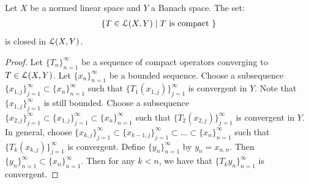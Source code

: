 \begin{theorem}
    Let $X$ be a normed linear space and $Y$ a Banach space. The set:
        \begin{equation*}
        \begin{split}
            \{T \in \mathcal{L}(X,Y) \mid T \text{ is compact }\}
        \end{split}
        \end{equation*}
    is closed in $\mathcal{L}(X,Y)$.
\end{theorem}
    \begin{proof}
        Let $\{T_n\}_{n = 1}^\infty$ be a sequence of compact operators converging to $T \in \mathcal{L}(X,Y)$. Let $\{x_n\}_{n = 1}^\infty$ be a bounded sequence. Choose a subsequence $\{x_{1,j}\}_{j = 1}^\infty \subset \{x_n\}_{n = 1}^\infty$ such that $\{T_1(x_{1,j})\}_{j = 1}^\infty$ is convergent in $Y$. Note that $\{x_{1,j}\}_{j = 1}^\infty$ is still bounded. Choose a subsequence $\{x_{2,j}\}_{j = 1}^\infty \subset \{x_{1,j}\}_{j = 1}^\infty \subset \{x_n\}_{n = 1}^\infty$ such that $\{T_2(x_{2,j})\}_{j = 1}^\infty$ is convergent in $Y$. In general, choose $\{x_{k,j}\}_{j = 1}^\infty \subset \{x_{k-1,j}\}_{j = 1}^\infty \subset ... \subset \{x_n\}_{n = 1}^\infty$ such that $\{T_k(x_{k,j})\}_{j = 1}^\infty$ is convergent. Define $\{y_n\}_{n = 1}^\infty$ by $y_n = x_{n,n}$. Then $\{y_n\}_{n = 1}^\infty \subset \{x_n\}_{n = 1}^\infty$. Then for any $k < n$, we have that $\{T_k y_n\}_{n = 1}^\infty$ is convergent.
    \end{proof}